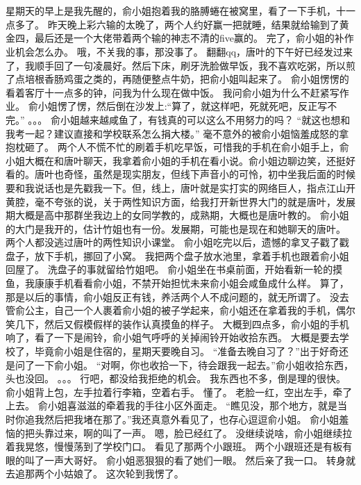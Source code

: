 \chapter{}
星期天的早上是我先醒的，俞小姐抱着我的胳膊蜷在被窝里，看了一下手机，十一点多了。
昨天晚上彩六输的太晚了，两个人约好赢一把就睡，结果就给输到了黄金四，最后还是一个大佬带着两个输的神志不清的five赢的。
完了，俞小姐的补作业机会怎么办。
哦，不关我的事，那没事了。
翻翻qq，唐叶的下午好已经发过来了，我顺手回了一句凌晨好。然后下床，刷牙洗脸做早饭，我不喜欢吃粥，所以煎了点培根香肠鸡蛋之类的，再随便整点牛奶，把俞小姐叫起来了。
俞小姐愣愣的看着客厅十一点多的钟，问我为什么现在做中饭。
我问俞小姐为什么不赶紧写作业。
俞小姐愣了愣，然后倒在沙发上:“算了，就这样吧，死就死吧，反正写不完。”
。。。
俞小姐越来越咸鱼了，有钱真的可以这么不用努力的吗？
“就这也想和我考一起？建议直接和学校联系怎么捐大楼。”
毫不意外的被俞小姐恼羞成怒的拿抱枕砸了。
两个人不慌不忙的刷着手机吃早饭，可惜我的手机在俞小姐手上，俞小姐大概在和唐叶聊天，我拿着俞小姐的手机在看小说。俞小姐边聊边笑，还挺好看的。唐叶也奇怪，虽然是现实朋友，但线下声音小的可怜，初中坐我后面的时候要和我说话也是先戳我一下。但，线上，唐叶就是实打实的网络巨人，指点江山开黄腔，毫不夸张的说，关于两性知识方面，给我打开新世界大门的就是唐叶，发展期大概是高中那群坐我边上的女同学教的，成熟期，大概也是唐叶教的。
俞小姐的大门是我开的，估计竹姐也有一份。发展期，可能也是现在和她聊天的唐叶。
两个人都没逃过唐叶的两性知识小课堂。
俞小姐吃完以后，遗憾的拿叉子戳了戳盘子，放下手机，挪回了小窝。
我把两个盘子放水池里，拿着手机也跟着俞小姐回屋了。
洗盘子的事就留给竹姐吧。
俞小姐坐在书桌前面，开始看新一轮的摸鱼，我康康手机看看俞小姐，不禁开始担忧未来俞小姐会咸鱼成什么样。
算了，那是以后的事情，俞小姐反正有钱，养活两个人不成问题的，就无所谓了。
没去管俞公主，自己一个人裹着俞小姐的被子学起来，俞小姐还在拿着我的手机，偶尔笑几下，然后又假模假样的装作认真摸鱼的样子。
大概到四点多，俞小姐的手机响了，看了一下是闹铃，俞小姐气呼呼的关掉闹铃开始收拾东西。
大概是要去学校了，毕竟俞小姐是住宿的，星期天要晚自习。
“准备去晚自习了？”出于好奇还是问了一下俞小姐。
“对啊，你也收拾一下，待会跟我一起去。”俞小姐收拾东西，头也没回。
。。。
行吧，都没给我拒绝的机会。
我东西也不多，倒是理的很快。
俞小姐背上包，左手拉着行李箱，空着右手。
懂了。
老脸一红，空出左手，牵了上去。
俞小姐喜滋滋的牵着我的手往小区外面走。
“瞧见没，那个地方，就是当时你追我然后把我堵在那了。”我还真意外看见了，也存心逗逗俞小姐。
俞小姐羞恼的把头靠过来，啊的叫了一声。
嗯，脸已经红了。
没继续说啥，俞小姐继续拉着我晃悠，慢慢荡到了学校门口。
看见了那两个小跟班。
两个小跟班还是有板有眼的叫了一声大哥好。
俞小姐恶狠狠的看了她们一眼。
然后亲了我一口。
转身就去追那两个小姑娘了。
这次轮到我愣了。

